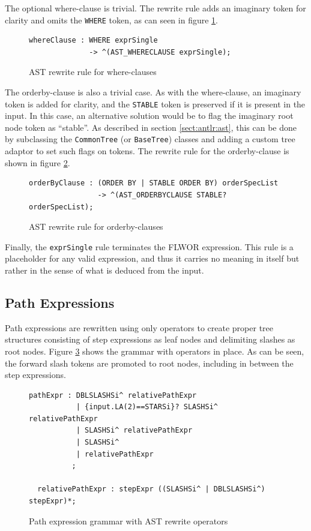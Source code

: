 The optional where-clause is trivial. The rewrite rule adds an imaginary
token for clarity and omits the \verb!WHERE! token, as can seen in figure
\ref{code:ast:whereclause}.

\begin{figure}[h!]
\begin{Verbatim} 
whereClause : WHERE exprSingle
              -> ^(AST_WHERECLAUSE exprSingle);
\end{Verbatim}
\caption{AST rewrite rule for where-clauses}
\label{code:ast:whereclause}
\end{figure}

The orderby-clause is also a trivial case. As with the where-clause, an
imaginary token is added for clarity, and the \verb!STABLE! token is preserved
if it is present in the input. In this case, an alternative solution would be to
flag the imaginary root node token as ``stable''. As described in section 
\ref{sect:antlr:ast}, this can be done by subclassing the \verb!CommonTree! (or
\verb!BaseTree!) classes and adding a custom tree adaptor to set such flags on
tokens. The rewrite rule for the orderby-clause is shown in figure
\ref{code:ast:orderbyclause}.

\begin{figure}[h!]
\begin{Verbatim} 
orderByClause : (ORDER BY | STABLE ORDER BY) orderSpecList
                -> ^(AST_ORDERBYCLAUSE STABLE? orderSpecList);
\end{Verbatim}
\caption{AST rewrite rule for orderby-clauses}
\label{code:ast:orderbyclause}
\end{figure}

Finally, the \verb!exprSingle! rule terminates the FLWOR expression. This rule
is a placeholder for any valid expression, and thus it carries no meaning in
itself but rather in the sense of what is deduced from the input.


\subsection{Path Expressions}
Path expressions are rewritten using only operators to create proper tree
structures consisting of step expressions as leaf nodes and delimiting slashes as
root nodes. Figure \ref{code:ast:pathexpr} shows the grammar with operators in
place. As can be seen, the forward slash tokens are promoted to root nodes,
including in between the step expressions.

\begin{figure}[h!]
\begin{Verbatim} 
pathExpr : DBLSLASHSi^ relativePathExpr
           | {input.LA(2)==STARSi}? SLASHSi^ relativePathExpr
           | SLASHSi^ relativePathExpr
           | SLASHSi^
           | relativePathExpr
          ;

  relativePathExpr : stepExpr ((SLASHSi^ | DBLSLASHSi^) stepExpr)*;
\end{Verbatim}
\caption{Path expression grammar with AST rewrite operators}
\label{code:ast:pathexpr}
\end{figure}


